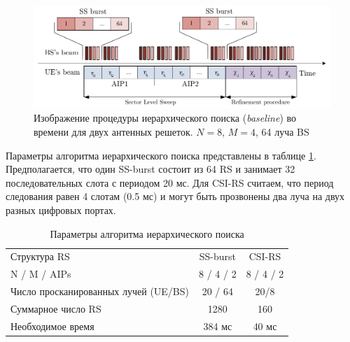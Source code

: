 \begin{figure}[ht]
    \centering
    \includegraphics[width=\linewidth]{figs/fig4.9}
    \caption{Изображение процедуры иерархического поиска (\textit{baseline}) во времени для двух антенных решеток. $N=8$, $M=4$, 64 луча BS}
    \label{fig:4.10}
\end{figure}

Параметры алгоритма иерархического поиска представлены в таблице \ref{tab:4.2}.
Предполагается, что один SS-burst состоит из 64 RS и занимает 32 последовательных слота с периодом 20 мс.
Для CSI-RS считаем, что период следования равен 4 слотам (0.5 мс) и могут быть
прозвонены два луча на двух разных цифровых портах.

\begin{table}
    \centering
    \caption{Параметры алгоритма иерархического поиска}
    \label{tab:4.2}
    \begin{tabular}{lcc}
        \toprule
        \midrule
        Структура RS                         & SS-burst  & CSI-RS    \\
        N / M / AIPs                         & 8 / 4 / 2 & 8 / 4 / 2 \\
        Число просканированных лучей (UE/BS) & 20 / 64   & 20/8      \\
        Суммарное число RS                   & 1280      & 160       \\
        Необходимое время                    & 384 мс    & 40 мс     \\
        \bottomrule
    \end{tabular}
\end{table}



